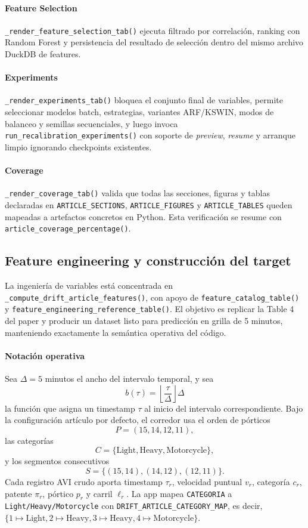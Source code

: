 \paragraph{Feature Selection}
\texttt{\_render\_feature\_selection\_tab()} ejecuta filtrado por correlaci\'on, ranking con Random Forest y persistencia del resultado de selecci\'on dentro del mismo archivo DuckDB de features.

\paragraph{Experiments}
\texttt{\_render\_experiments\_tab()} bloquea el conjunto final de variables, permite seleccionar modelos batch, estrategias, variantes ARF/KSWIN, modos de balanceo y semillas secuenciales, y luego invoca \texttt{run\_recalibration\_experiments()} con soporte de \textit{preview}, \textit{resume} y arranque limpio ignorando checkpoints existentes.

\paragraph{Coverage}
\texttt{\_render\_coverage\_tab()} valida que todas las secciones, figuras y tablas declaradas en \texttt{ARTICLE\_SECTIONS}, \texttt{ARTICLE\_FIGURES} y \texttt{ARTICLE\_TABLES} queden mapeadas a artefactos concretos en Python. Esta verificaci\'on se resume con \texttt{article\_coverage\_percentage()}.

\subsection{Feature engineering y construcci\'on del target}
La ingenier\'ia de variables est\'a concentrada en \texttt{\_compute\_drift\_article\_features()}, con apoyo de \texttt{feature\_catalog\_table()} y \texttt{feature\_engineering\_reference\_table()}. El objetivo es replicar la Table 4 del paper y producir un dataset listo para predicci\'on en grilla de 5 minutos, manteniendo exactamente la sem\'antica operativa del c\'odigo.

\paragraph{Notaci\'on operativa}
Sea \(\Delta = 5\) minutos el ancho del intervalo temporal, y sea
\[
b(\tau) = \left\lfloor \frac{\tau}{\Delta} \right\rfloor \Delta
\]
la funci\'on que asigna un timestamp \(\tau\) al inicio del intervalo correspondiente. Bajo la configuraci\'on art\'iculo por defecto, el corredor usa el orden de p\'orticos
\[
P = (15, 14, 12, 11),
\]
las categor\'ias
\[
C = \{\mathrm{Light}, \mathrm{Heavy}, \mathrm{Motorcycle}\},
\]
y los segmentos consecutivos
\[
S = \{(15,14), (14,12), (12,11)\}.
\]
Cada registro AVI crudo aporta timestamp \(\tau_r\), velocidad puntual \(v_r\), categor\'ia \(c_r\), patente \(\pi_r\), p\'ortico \(p_r\) y carril \(\ell_r\). La app mapea \texttt{CATEGORIA} a \texttt{Light/Heavy/Motorcycle} con \texttt{DRIFT\_ARTICLE\_CATEGORY\_MAP}, es decir, \(\{1\mapsto \mathrm{Light}, 2\mapsto \mathrm{Heavy}, 3\mapsto \mathrm{Heavy}, 4\mapsto \mathrm{Motorcycle}\}\).

